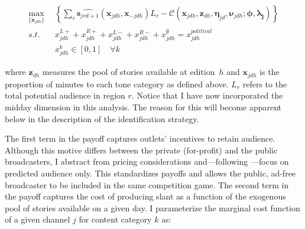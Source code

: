\documentclass[12pt]{article}
\begin{document}
\begin{equation}\label{eq:payoffs}
	\begin{aligned}
		\max_{\{\mathbf{x}_{jdh}\}}   & \left\{   \sum_{r}\widehat{\bm{s}_{jrd+1}}(\bm{x}_{jdh}, \bm{x}_{-jdh})L_r -  \mathcal{C}\left(  \bm{x}_{jdh},\bm{z}_{dh}, \bm{\eta}_{jd},\bm{\nu}_{jdh}; \bm{\phi},\bm{\lambda_j}   \right)    \right\}\\
		s.t.   \quad &   x_{jdh}^{L+} +x_{jdh}^{R+} + x_{jdh}^{L-} + x_{jdh}^{R-} + x_{jdh}^{\emptyset} = x_{jdh}^{political}\\
		& x_{jdh}^k \in [0,1] \quad \forall k
	\end{aligned}
\end{equation} 



where $\bm z_{dh}$ measures the pool of stories available at edition~$h$ and $\bm x_{jdh}$ is the proportion of minutes to each tone category as defined above. $L_r$  refers to the total potential audience in region $r$. Notice that I have now incorporated the midday dimension in this analysis. The reason for this will become apparent below in the description of the identification strategy. 

The first term in the payoff captures outlets’ incentives to retain audience. Although this motive differs between the private (for-profit)  and the public broadcasters, I abstract from pricing considerations and—following \cite{Goettler2001SpatialCI}—focus on predicted audience only. This standardizes payoffs and allows the public, ad-free broadcaster to be included in the same competition game. The second term in the payoff captures the cost of producing slant as a function of the exogenous pool of stories available on a given day. I parameterize the marginal cost function of a given channel $j$ for content category $k$ as:

\end{document}
